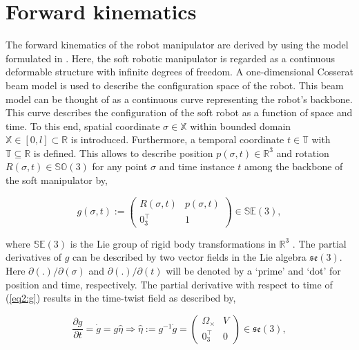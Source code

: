 

\section{Forward kinematics}

The forward kinematics of the robot manipulator are derived by using the model formulated in \cite{Caasenbrood2020}. Here, the soft robotic manipulator is regarded as a continuous deformable structure with infinite degrees of freedom. A one-dimensional Cosserat beam model is used to describe the configuration space of the robot. This beam model can be thought of as a continuous curve representing the robot's backbone. This curve describes the configuration of the soft robot as a function of space and time. To this end, spatial coordinate $\sigma \in \mathbb{X}$ within bounded domain $\mathbb{X} \in [0,l] \subset \mathbb{R}$ is introduced. Furthermore, a temporal coordinate $t \in  \mathbb{T}$ with $\mathbb{T} \subseteq \mathbb{R}$ is defined. This allows to describe position $p(\sigma,t) \in \mathbb{R}^3$ and rotation $R(\sigma,t) \in \mathbb{SO}(3)$ 
for any point $\sigma$ and time instance $t$ among the backbone of the soft manipulator by,


\begin{equation}
    g(\sigma,t) := \begin{pmatrix}  R(\sigma,t) & p(\sigma,t) \\ 0_3^\top & 1 \end{pmatrix} \in \mathbb{SE}(3),
    \label{eq2:g}
\end{equation}

where $\mathbb{SE}(3)$ is the Lie group of rigid body transformations in $\mathbb{R}^3$ \cite{Sola2018}. The partial derivatives of $g$ can be described by two vector fields in the Lie algebra $\mathfrak{se}(3)$. Here $\partial (.)/\partial(\sigma)$ and $\partial (.)/\partial(t)$ will be denoted by a `prime' and `dot' for position and time, respectively. The partial derivative with respect to time of (\ref{eq2:g}) results in the time-twist field as described by,

\begin{equation}
    \frac{\partial g}{\partial t} = \dot{g} = g\hat{\eta} \Longrightarrow \hat{\eta} := g^{-1}\dot{g} = \begin{pmatrix} \Omega_\times & V \\ 0_3^\top & 0 \end{pmatrix} \in  \mathfrak{se}(3),
    \label{eq2:dotg}
\end{equation}

